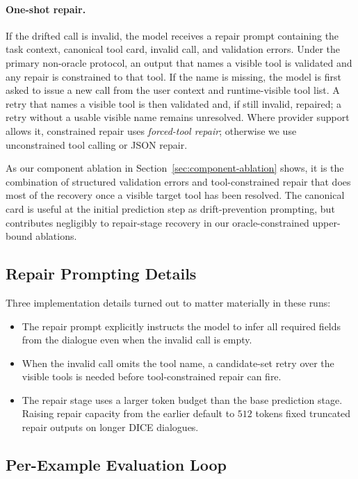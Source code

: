 \documentclass{llncs}
\begin{document}
\paragraph{One-shot repair.}
If the drifted call is invalid, the model receives a repair prompt containing the
task context, canonical tool card, invalid call, and validation errors. Under the
primary non-oracle protocol, an output that names a visible tool is validated and
any repair is constrained to that tool. If the name is missing, the model is first
asked to issue a new call from the user context and runtime-visible tool list. A
retry that names a visible tool is then validated and, if still invalid, repaired;
a retry without a usable visible name remains unresolved. Where provider support
allows it, constrained repair uses \emph{forced-tool repair}; otherwise we use
unconstrained tool calling or JSON repair.

As our component ablation in Section~\ref{sec:component-ablation} shows, it is the
combination of structured validation errors and tool-constrained repair that does
most of the recovery once a visible target tool has been resolved. The canonical
card is useful at the initial prediction step as drift-prevention prompting, but
contributes negligibly to repair-stage recovery in our oracle-constrained
upper-bound ablations.

\subsection{Repair Prompting Details}
Three implementation details turned out to matter materially in these runs:
\begin{itemize}
\item The repair prompt explicitly instructs the model to infer all required fields
from the dialogue even when the invalid call is empty.
\item When the invalid call omits the tool name, a candidate-set retry over the
visible tools is needed before tool-constrained repair can fire.
\item The repair stage uses a larger token budget than the base prediction stage.
Raising repair capacity from the earlier default to $512$ tokens fixed truncated
repair outputs on longer DICE dialogues.
\end{itemize}

\subsection{Per-Example Evaluation Loop}
\label{subsec:eval-loop}
\end{document}

